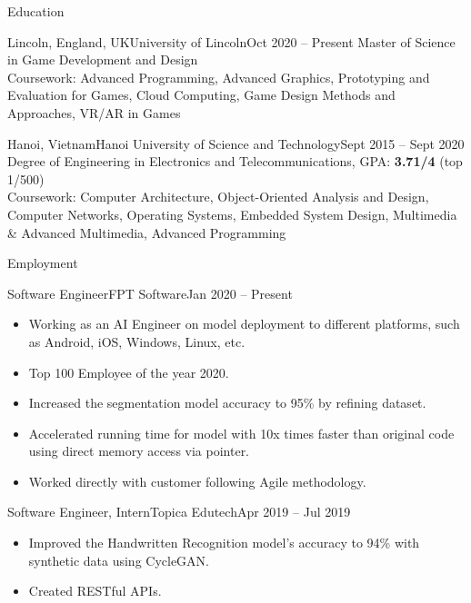 \documentclass[calibri]{mcdowellcv}
\begin{document}
	\makeheader
	
	\begin{cvsection}{Education}
		\begin{cvsubsection}{Lincoln, England, UK}{University of Lincoln}{Oct 2020 -- Present}
			Master of Science in Game Development and Design \\
			Coursework: Advanced Programming, Advanced Graphics, Prototyping and Evaluation for Games, Cloud Computing, Game Design Methods and Approaches, VR/AR in Games
		\end{cvsubsection}

		\begin{cvsubsection}{Hanoi, Vietnam}{Hanoi University of Science and Technology}{Sept 2015 -- Sept 2020}
			Degree of Engineering in Electronics and Telecommunications, GPA: \textbf{3.71/4} (top 1/500) \\
			Coursework: Computer Architecture, Object-Oriented Analysis and Design, Computer Networks, Operating Systems, Embedded System Design, Multimedia \& Advanced Multimedia, Advanced Programming
		\end{cvsubsection}
	\end{cvsection}
	
	\begin{cvsection}{Employment}
		\begin{cvsubsection}{Software Engineer}{FPT Software}{Jan 2020 -- Present}
			\begin{itemize}
				\item Working as an AI Engineer on model deployment to different platforms, such as Android, iOS, Windows, Linux, etc.
				\item Top 100 Employee of the year 2020.
				\item Increased the segmentation model accuracy to 95\% by refining dataset.
				\item Accelerated running time for model with 10x times faster than original code using direct memory access via pointer.
				\item Worked directly with customer following Agile methodology.
			\end{itemize}
		\end{cvsubsection}
		
		\begin{cvsubsection}{Software Engineer, Intern}{Topica Edutech}{Apr 2019 -- Jul 2019}	
			\begin{itemize}
				\item Improved the Handwritten Recognition model's accuracy to 94\% with synthetic data using CycleGAN.
				\item Created RESTful APIs.
			\end{itemize}
		\end{cvsubsection}
	\end{cvsection}
	
\end{document}
